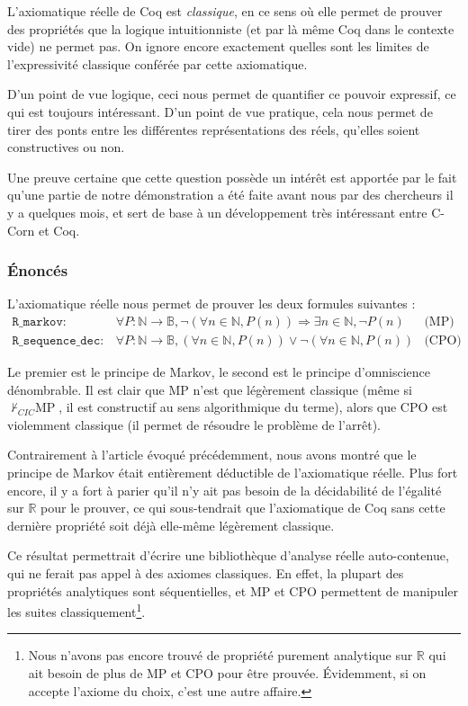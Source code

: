 L'axiomatique réelle de Coq est \emph{classique}, en ce sens où elle permet de prouver des propriétés que la logique intuitionniste (et par là même Coq dans le contexte vide) ne permet pas. On ignore encore exactement quelles sont les limites de l'expressivité classique conférée par cette axiomatique.

D'un point de vue logique, ceci nous permet de quantifier ce pouvoir expressif, ce qui est toujours intéressant. D'un point de vue pratique, cela nous permet de tirer des ponts entre les différentes représen\-tations des réels, qu'elles soient constructives ou non.

Une preuve certaine que cette question possède un intérêt est apportée par le fait qu'une partie de notre démonstration a été faite avant nous par des chercheurs il y a quelques mois, et sert de base à un développement très intéressant entre C-Corn et Coq.

\subsubsection{Énoncés}

L'axiomatique réelle nous permet de prouver les deux formules suivantes :
$$\begin{array}{llc}
\mathtt{R\_markov} :& \forall P : \mathbb{N}\rightarrow\mathbb{B}, \neg(\forall n\in\mathbb{N}, P(n)) \Rightarrow \exists n\in\mathbb{N}, \neg P(n) & \text{(MP)}\\
\mathtt{R\_sequence\_dec} :& \forall P : \mathbb{N}\rightarrow\mathbb{B}, (\forall n\in\mathbb{N}, P(n)) \vee \neg(\forall n\in\mathbb{N}, P(n)) & \text{(CPO)}
\end{array}$$

Le premier est le principe de Markov, le second est le principe d'omniscience dénombrable. Il est clair que MP n'est que légèrement classique (même si $\not\vdash_{CIC}\text{MP}$, il est constructif au sens algorithmique du terme), alors que CPO est violemment classique (il permet de résoudre le problème de l'arrêt).

Contrairement à l'article évoqué précédemment, nous avons montré que le principe de Markov était entièrement déductible de l'axiomatique réelle. Plus fort encore, il y a fort à parier qu'il n'y ait pas besoin de la décidabilité de l'égalité sur $\mathbb{R}$ pour le prouver, ce qui sous-tendrait que l'axiomatique de Coq sans cette dernière propriété soit déjà elle-même légèrement classique.

Ce résultat permettrait d'écrire une bibliothèque d'analyse réelle auto-contenue, qui ne ferait pas appel à des axiomes classiques. En effet, la plupart des propriétés analytiques sont séquentielles, et MP et CPO permettent de manipuler les suites classiquement\footnote{Nous n'avons pas encore trouvé de propriété purement analytique sur $\mathbb{R}$ qui ait besoin de plus de MP et CPO pour être prouvée. Évidemment, si on accepte l'axiome du choix, c'est une autre affaire.}.

